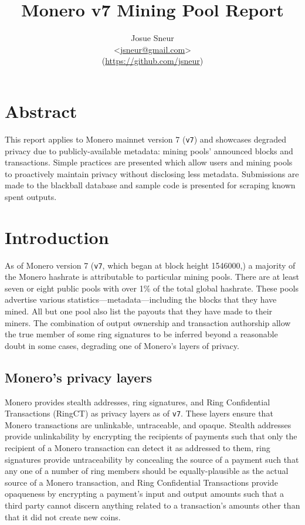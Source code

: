 \documentclass[notitlepage]{report}
\title{Monero v7 Mining Pool Report}
\author{Josue Sneur \\
\textless\url{jsneur@gmail.com}\textgreater \\
(\url{https://github.com/jsneur})}
\begin{document}
\maketitle
\thispagestyle{empty}

\section*{Abstract}

This report applies to Monero mainnet version 7 (\texttt{v7}) and showcases degraded privacy due to publicly-available metadata: mining pools' announced blocks and transactions.  Simple practices are presented which allow users and mining pools to proactively maintain privacy without disclosing less metadata.  Submissions are made to the blackball database and sample code is presented for scraping known spent outputs.


\tableofcontents

\clearpage

\section{Introduction}
\setcounter{chapter}{1}


As of Monero version 7 (\texttt{v7}, which began at block height 1546000,) a majority of the Monero hashrate is attributable to particular mining pools.  There are at least seven or eight public pools with over 1\% of the total global hashrate.  These pools advertise various statistics---metadata---including the blocks that they have mined.  All but one pool also list the payouts that they have made to their miners.  The combination of output ownership and transaction authorship allow the true member of some ring signatures to be inferred beyond a reasonable doubt in some cases, degrading one of Monero's layers of privacy.

\subsection{Monero's privacy layers}

Monero provides stealth addresses, ring signatures, and Ring Confidential Transactions (RingCT) as privacy layers as of \texttt{v7}.  These layers ensure that Monero transactions are unlinkable, untraceable, and opaque.  Stealth addresses provide unlinkability by encrypting the recipients of payments such that only the recipient of a Monero transaction can detect it as addressed to them, ring signatures provide untraceability by concealing the source of a payment such that any one of a number of ring members should be equally-plausible as the actual source of a Monero transaction, and Ring Confidential Transactions provide opaqueness by encrypting a payment's input and output amounts such that a third party cannot discern anything related to a transaction's amounts other than that it did not create new coins.
\end{document}
